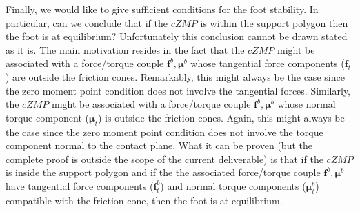 \documentclass[12pt,a4paper,twoside]{article}
\begin{document}
Finally, we would like to give sufficient conditions for the foot stability. In particular, can we conclude that if the $cZMP$ is within the support polygon then the foot is at equilibrium? Unfortunately this conclusion cannot be drawn stated as it is. The main motivation resides in the fact that the $cZMP$ might be associated with a force/torque couple $\boldsymbol f^b, \boldsymbol\mu^b$ whose tangential force components ($\boldsymbol f_t$) are outside the friction cones. Remarkably, this might always be the case since the zero moment point condition does not involve the tangential forces. Similarly,  the $cZMP$ might be associated with a force/torque couple $\boldsymbol f^b, \boldsymbol\mu^b$ whose normal torque component ($\boldsymbol \mu_t$) is outside the friction cones. Again, this might always be the case since the zero moment point condition does not involve the torque component normal to the contact plane. What it can be proven (but the complete proof is outside the scope of the current deliverable) is that if the $cZMP$ is inside the support polygon and if the the associated force/torque couple $\boldsymbol f^b, \boldsymbol\mu^b$ have tangential force components ($\boldsymbol f^b_t$) and normal torque components ($\boldsymbol \mu^b_t$) compatible with the friction cone, then the foot is at equilibrium.
\end{document}
